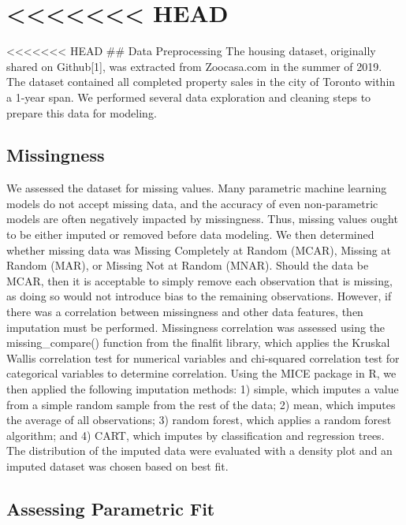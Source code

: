 \documentclass[11pt,]{article}
\begin{document}
\hypertarget{head}{%
\section{\textless\textless\textless\textless\textless\textless\textless{}
HEAD}\label{head}}

\textless\textless\textless\textless\textless\textless\textless{} HEAD
\#\# Data Preprocessing The housing dataset, originally shared on
Github{[}1{]}, was extracted from Zoocasa.com in the summer of 2019. The
dataset contained all completed property sales in the city of Toronto
within a 1-year span. We performed several data exploration and cleaning
steps to prepare this data for modeling.

\hypertarget{missingness-1}{%
\subsection{Missingness}\label{missingness-1}}

We assessed the dataset for missing values. Many parametric machine
learning models do not accept missing data, and the accuracy of even
non-parametric models are often negatively impacted by missingness.
Thus, missing values ought to be either imputed or removed before data
modeling. We then determined whether missing data was Missing Completely
at Random (MCAR), Missing at Random (MAR), or Missing Not at Random
(MNAR). Should the data be MCAR, then it is acceptable to simply remove
each observation that is missing, as doing so would not introduce bias
to the remaining observations. However, if there was a correlation
between missingness and other data features, then imputation must be
performed. Missingness correlation was assessed using the
missing\_compare() function from the finalfit library, which applies the
Kruskal Wallis correlation test for numerical variables and chi-squared
correlation test for categorical variables to determine correlation.
Using the MICE package in R, we then applied the following imputation
methods: 1) simple, which imputes a value from a simple random sample
from the rest of the data; 2) mean, which imputes the average of all
observations; 3) random forest, which applies a random forest algorithm;
and 4) CART, which imputes by classification and regression trees. The
distribution of the imputed data were evaluated with a density plot and
an imputed dataset was chosen based on best fit.

\hypertarget{assessing-parametric-fit}{%
\subsection{Assessing Parametric Fit}\label{assessing-parametric-fit}}
\end{document}
